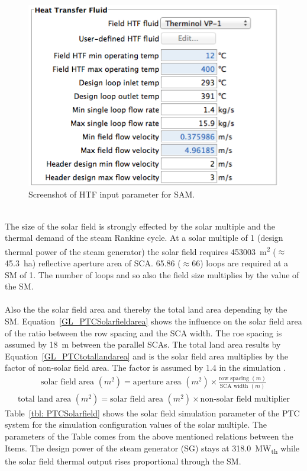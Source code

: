 \documentclass[Master,MEE,english]{twbook}%
\begin{document}
\begin{figure}[htbp]  
\centering
\includegraphics[width=0.6\linewidth]{FIG/PTC_HTF}
\caption[Screenshot of HTF input parameter for SAM.]{Screenshot of HTF input parameter for SAM.}\label{PTC_HTF}
\end{figure}
\\
The size of the solar field is strongly effected by the solar multiple and the thermal demand of the steam Rankine cycle. At a solar multiple of 1 (design thermal power of the steam generator) the solar field requires 453003~m\textsuperscript{2} ($\approx$45.3~ha) reflective aperture area of SCA. 65.86 ($\approx$66) loops are required at a SM of 1. The number of loops and so also the field size multiplies by the value of the SM.\\
\\
Also the the solar field area and thereby the total land area depending by the SM. Equation~\ref{GL_PTCSolarfieldarea} shows the influence on the solar field area of the ratio between the row spacing and the SCA width. The roe spacing is assumed by 18~m between the parallel SCAs. The total land area results by Equation~\ref{GL_PTCtotallandarea} and is the solar field area multiplies by the factor of non-solar field area. The factor is assumed by 1.4 in the simulation \cite{NREL2015a}.
\begin{align}
\textrm{solar field area }(m^2) =\textrm{aperture area }(m^2) \times \frac{\textrm{row spacing }(m)}{ \textrm{SCA width }(m)} \label{GL_PTCSolarfieldarea}
\end{align}
\begin{align}
\textrm{total land area }(m^2) =\textrm{solar field area }(m^2) \times  \textrm{non-solar field multiplier}\label{GL_PTCtotallandarea}
\end{align}
Table~\ref{tbl: PTCSolarfield} shows the solar field simulation parameter of the PTC system for the simulation configuration values of the solar multiple. The parameters of the Table comes from the above mentioned relations between the Items. The design power of the steam generator (SG) stays at 318.0~MW\textsubscript{th} while the solar field thermal output rises proportional through the SM. 
\end{document}
